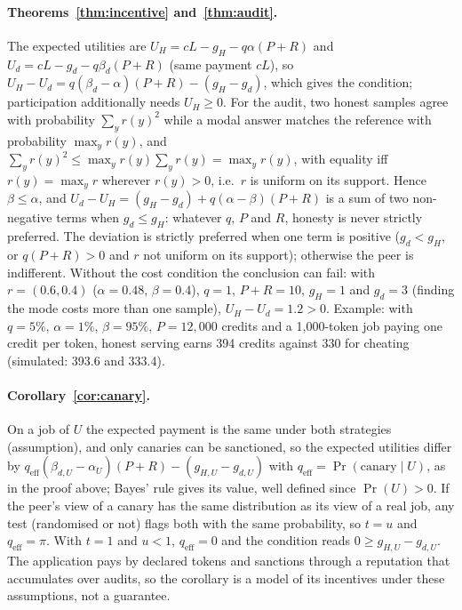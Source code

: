 \documentclass[11pt]{article}
\theoremstyle{definition}
\theoremstyle{remark}
\begin{document}
\paragraph{Theorems~\ref{thm:incentive} and~\ref{thm:audit}.}
The expected utilities are $U_H=cL-g_H-q\alpha(P+R)$ and $U_d=cL-g_d-q\beta_d(P+R)$ (same payment $cL$),
so $U_H-U_d=q(\beta_d-\alpha)(P+R)-(g_H-g_d)$, which gives the condition; participation additionally
needs $U_H\ge0$. For the audit, two honest samples agree with probability $\sum_yr(y)^2$ while a modal
answer matches the reference with probability $\max_yr(y)$, and
$\sum_yr(y)^2\le\max_yr(y)\sum_yr(y)=\max_yr(y)$, with equality iff $r(y)=\max_yr$ wherever $r(y)>0$, i.e.\
$r$ is uniform on its support. Hence $\beta\le\alpha$, and
$U_d-U_H=(g_H-g_d)+q(\alpha-\beta)(P+R)$ is a sum of two non-negative terms when $g_d\le g_H$: whatever
$q$, $P$ and $R$, honesty is never strictly preferred. The deviation is strictly preferred when one term is
positive ($g_d<g_H$, or $q(P+R)>0$ and $r$ not uniform on its support); otherwise the peer is indifferent.
Without the cost condition the conclusion can fail: with $r=(0.6,0.4)$ ($\alpha=0.48$, $\beta=0.4$), $q=1$,
$P+R=10$, $g_H=1$ and $g_d=3$ (finding the mode costs more than one sample), $U_H-U_d=1.2>0$.
Example: with $q=5\%$, $\alpha=1\%$, $\beta=95\%$, $P=12{,}000$ credits and a 1{,}000-token job paying one
credit per token, honest serving earns 394 credits against 330 for cheating (simulated: 393.6 and 333.4).

\paragraph{Corollary~\ref{cor:canary}.}
On a job of $U$ the expected payment is the same under both strategies (assumption), and only canaries
can be sanctioned, so the expected utilities differ by
$q_{\mathrm{eff}}(\beta_{d,U}-\alpha_U)(P+R)-(g_{H,U}-g_{d,U})$ with $q_{\mathrm{eff}}=\Pr(\text{canary}\mid U)$,
as in the proof above; Bayes' rule gives its value, well defined since $\Pr(U)>0$. If the peer's view of a
canary has the same distribution as its view of a real job, any test (randomised or not) flags both with
the same probability, so $t=u$ and $q_{\mathrm{eff}}=\pi$. With $t=1$ and $u<1$, $q_{\mathrm{eff}}=0$ and the
condition reads $0\ge g_{H,U}-g_{d,U}$. The application pays by declared tokens and sanctions through a
reputation that accumulates over audits, so the corollary is a model of its incentives under these
assumptions, not a guarantee.
\end{document}
